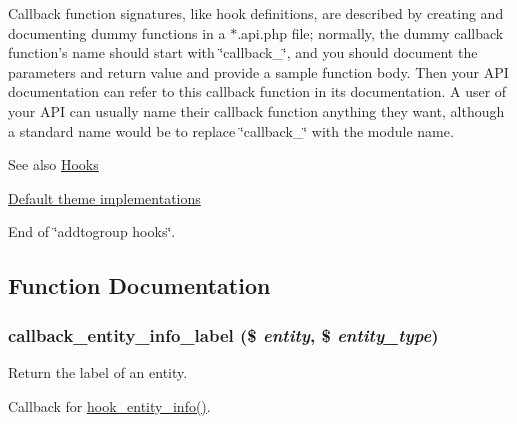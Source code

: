 Callback function signatures, like hook definitions, are described by creating and documenting dummy functions in a $\ast$.api.php file; normally, the dummy callback function's name should start with \char`\"{}callback\_\-\char`\"{}, and you should document the parameters and return value and provide a sample function body. Then your API documentation can refer to this callback function in its documentation. A user of your API can usually name their callback function anything they want, although a standard name would be to replace \char`\"{}callback\_\-\char`\"{} with the module name.

\begin{DoxySeeAlso}{See also}
\hyperlink{group__hooks}{Hooks} 

\hyperlink{group__themeable}{Default theme implementations}
\end{DoxySeeAlso}
End of \char`\"{}addtogroup hooks\char`\"{}. 

\subsection{Function Documentation}
\hypertarget{group__callbacks_gae9464157712e8322955f45a671a8403d}{
\subsubsection[{callback\_\-entity\_\-info\_\-label}]{\setlength{\rightskip}{0pt plus 5cm}callback\_\-entity\_\-info\_\-label (\$ {\em entity}, \/  \$ {\em entity\_\-type})}}
\label{group__callbacks_gae9464157712e8322955f45a671a8403d}
Return the label of an entity.

Callback for \hyperlink{group__hooks_gaf02318e9d0e8cdbf6d187b271b9969a8}{hook\_\-entity\_\-info()}.


